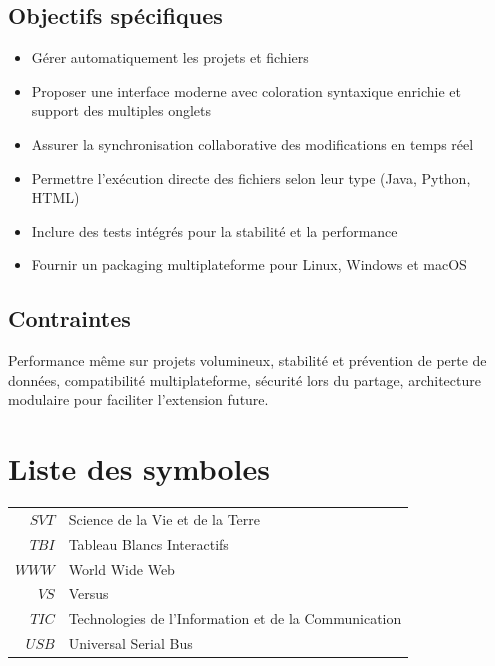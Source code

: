 \documentclass[a4paper,oneside,12pt]{book}
\begin{document}
\section*{Objectifs spécifiques}
\begin{itemize}
	\item[-] Gérer automatiquement les projets et fichiers
	\item[-] Proposer une interface moderne avec coloration syntaxique enrichie et support des multiples onglets
	\item[-] Assurer la synchronisation collaborative des modifications en temps réel
	\item[-] Permettre l’exécution directe des fichiers selon leur type (Java, Python, HTML)
	\item[-] Inclure des tests intégrés pour la stabilité et la performance
	\item[-] Fournir un packaging multiplateforme pour Linux, Windows et macOS
\end{itemize}

\section*{Contraintes}
Performance même sur projets volumineux, stabilité et prévention de perte de données, compatibilité multiplateforme, sécurité lors du partage, architecture modulaire pour faciliter l’extension future.

\renewcommand{\contentsname}{Table des matières}
\tableofcontents
\listoftables
{}
\listoffigures
{}
\chapter{Liste des symboles}
\begin{tabular}{r|l}
	 
	 $SVT$	&Science de la Vie et de la Terre\\ 
	 $TBI$ & Tableau Blancs Interactifs \\
	 $WWW$&	World Wide Web\\
	  $VS$&	Versus\\
	 $TIC$& Technologies de l'Information et de la Communication\\
	 $USB$&  Universal Serial Bus\\

	 
\end{tabular}
\end{document}
